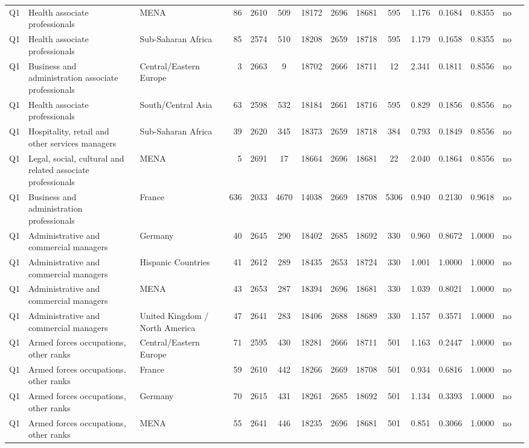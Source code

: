 \begin{longtable}{lllrcccccccccll}
Q1 & Health associate professionals & MENA & 86 & 2610 & 509 & 18172 & 2696 & 18681 & 595 & 1.176 & 0.1684 & 0.8355 & no \\
Q1 & Health associate professionals & Sub-Saharan Africa & 85 & 2574 & 510 & 18208 & 2659 & 18718 & 595 & 1.179 & 0.1658 & 0.8355 & no \\
Q1 & Business and administration associate professionals & Central/Eastern Europe & 3 & 2663 & 9 & 18702 & 2666 & 18711 & 12 & 2.341 & 0.1811 & 0.8556 & no \\
Q1 & Health associate professionals & South/Central Asia & 63 & 2598 & 532 & 18184 & 2661 & 18716 & 595 & 0.829 & 0.1856 & 0.8556 & no \\
Q1 & Hospitality, retail and other services managers & Sub-Saharan Africa & 39 & 2620 & 345 & 18373 & 2659 & 18718 & 384 & 0.793 & 0.1849 & 0.8556 & no \\
Q1 & Legal, social, cultural and related associate professionals & MENA & 5 & 2691 & 17 & 18664 & 2696 & 18681 & 22 & 2.040 & 0.1864 & 0.8556 & no \\
Q1 & Business and administration professionals & France & 636 & 2033 & 4670 & 14038 & 2669 & 18708 & 5306 & 0.940 & 0.2130 & 0.9618 & no \\
Q1 & Administrative and commercial managers & Germany & 40 & 2645 & 290 & 18402 & 2685 & 18692 & 330 & 0.960 & 0.8672 & 1.0000 & no \\
Q1 & Administrative and commercial managers & Hispanic Countries & 41 & 2612 & 289 & 18435 & 2653 & 18724 & 330 & 1.001 & 1.0000 & 1.0000 & no \\
Q1 & Administrative and commercial managers & MENA & 43 & 2653 & 287 & 18394 & 2696 & 18681 & 330 & 1.039 & 0.8021 & 1.0000 & no \\
Q1 & Administrative and commercial managers & United Kingdom / North America & 47 & 2641 & 283 & 18406 & 2688 & 18689 & 330 & 1.157 & 0.3571 & 1.0000 & no \\
Q1 & Armed forces occupations, other ranks & Central/Eastern Europe & 71 & 2595 & 430 & 18281 & 2666 & 18711 & 501 & 1.163 & 0.2447 & 1.0000 & no \\
Q1 & Armed forces occupations, other ranks & France & 59 & 2610 & 442 & 18266 & 2669 & 18708 & 501 & 0.934 & 0.6816 & 1.0000 & no \\
Q1 & Armed forces occupations, other ranks & Germany & 70 & 2615 & 431 & 18261 & 2685 & 18692 & 501 & 1.134 & 0.3393 & 1.0000 & no \\
Q1 & Armed forces occupations, other ranks & MENA & 55 & 2641 & 446 & 18235 & 2696 & 18681 & 501 & 0.851 & 0.3066 & 1.0000 & no \\

\end{longtable}
